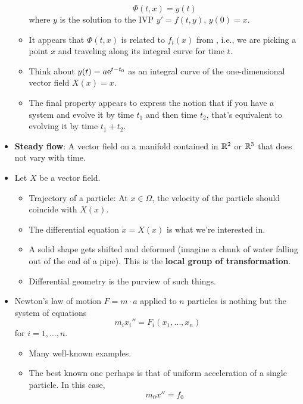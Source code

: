 \documentclass[../notes.tex]{subfiles}
\begin{document}
\begin{itemize}
\begin{itemize}
        \begin{equation*}
            \Phi(t,x) = y(t)
        \end{equation*}
        where $y$ is the solution to the IVP $y'=f(t,y)$, $y(0)=x$.
        \item It appears that $\Phi(t,x)$ is related to $f_t(x)$ from \textcite{bib:DifferentialForms}, i.e., we are picking a point $x$ and traveling along its integral curve for time $t$.
        \item Think about $y(t)=a\e[t-t_0]$ as an integral curve of the one-dimensional vector field $X(x)=x$.
        \item The final property appears to express the notion that if you have a system and evolve it by time $t_1$ and then time $t_2$, that's equivalent to evolving it by time $t_1+t_2$.
    \end{itemize}
    \item \textbf{Steady flow}: A vector field on a manifold contained in $\R^2$ or $\R^3$ that does not vary with time.
    \item Let $X$ be a vector field.
    \begin{itemize}
        \item Trajectory of a particle: At $x\in\Omega$, the velocity of the particle should coincide with $X(x)$.
        \item The differential equation $\dot{x}=X(x)$ is what we're interested in.
        \item A solid shape gets shifted and deformed (imagine a chunk of water falling out of the end of a pipe). This is the \textbf{local group of transformation}.
        \item Differential geometry is the purview of such things.
    \end{itemize}
    \item Newton's law of motion $F=m\cdot a$ applied to $n$ particles is nothing but the system of equations
    \begin{equation*}
        m_ix_i'' = F_i(x_1,\dots,x_n)
    \end{equation*}
    for $i=1,\dots,n$.
    \begin{itemize}
        \item Many well-known examples.
        \item The best known one perhaps is that of uniform acceleration of a single particle. In this case,
        \begin{equation*}
            m_0x'' = f_0
        \end{equation*}

\end{itemize}
\end{itemize}
\end{document}
